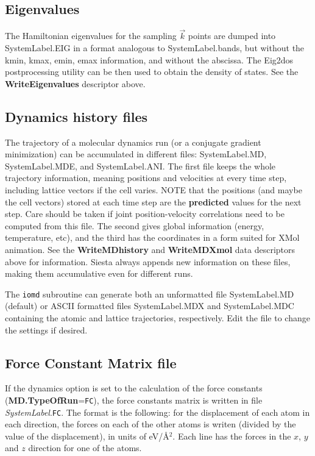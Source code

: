 \documentclass[11pt]{article}
\begin{document}
\subsection{Eigenvalues}

The Hamiltonian eigenvalues for the sampling $\vec k$ points are
dumped into SystemLabel.EIG in a format analogous to SystemLabel.bands,
but without the kmin, kmax, emin, emax information, and without
the abscissa. The {\sc Eig2dos}
postprocessing utility can be then used to obtain the density of
states. 
See the {\bf WriteEigenvalues} descriptor above.



\subsection{Dynamics history files}
The trajectory of a molecular dynamics run (or a conjugate gradient
minimization) can be accumulated in different files: SystemLabel.MD,
SystemLabel.MDE, and SystemLabel.ANI. The first file keeps the whole trajectory
information, meaning positions and velocities at every time step, 
including lattice vectors if the cell varies. NOTE that the positions
(and maybe the cell vectors) stored at each time step are the {\bf
  predicted} values for the next step. Care should be taken if joint
position-velocity correlations need to be computed from this file.
The second gives global information (energy, temperature, etc),
and the third has the coordinates in a form suited for XMol animation.
See the {\bf WriteMDhistory} and {\bf WriteMDXmol} data descriptors 
above for information. {\sc Siesta} always appends new information on these
files, making them accumulative even for different runs.

The {\tt iomd} subroutine can generate both
an unformatted file SystemLabel.MD (default) or  ASCII formatted files
SystemLabel.MDX and SystemLabel.MDC containing the atomic and lattice
trajectories, respectively. Edit the file to change the settings if desired.

\subsection{Force Constant Matrix file}

If the dynamics option is set to the calculation 
of the force constants ({\bf MD.TypeOfRun}={\tt FC}),
the force constants matrix is written in file {\it SystemLabel}.{\tt FC}.
The format is the following: for the displacement of
each atom in each direction, the forces on each of the other
atoms is writen (divided by the value of the displacement),
in units of eV/\AA$^2$. Each line has the forces in the $x$, $y$
and $z$ direction for one of the atoms.
\end{document}
